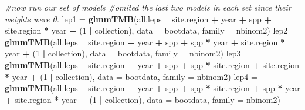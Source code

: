\documentclass[]{article}
\newenvironment{Shaded}{\begin{snugshade}}{\end{snugshade}}
\newcommand{\KeywordTok}[1]{\textcolor[rgb]{0.13,0.29,0.53}{\textbf{#1}}}
\newcommand{\DataTypeTok}[1]{\textcolor[rgb]{0.13,0.29,0.53}{#1}}
\newcommand{\DecValTok}[1]{\textcolor[rgb]{0.00,0.00,0.81}{#1}}
\newcommand{\StringTok}[1]{\textcolor[rgb]{0.31,0.60,0.02}{#1}}
\newcommand{\CommentTok}[1]{\textcolor[rgb]{0.56,0.35,0.01}{\textit{#1}}}
\newcommand{\OperatorTok}[1]{\textcolor[rgb]{0.81,0.36,0.00}{\textbf{#1}}}
\newcommand{\NormalTok}[1]{#1}
\begin{document}
\begin{Shaded}
\begin{Highlighting}[]
{{{{{{{{{{{{{{{{{{{{{{{{{{{{{{{{{{{{{{{{{{{{{{{{{{{{{{{{{{{{{{{{{{{{{{{{{  \CommentTok{#now run our set of models       }
  \CommentTok{#omited the last two models in each set since their weights were 0. }
\NormalTok{  lep1 =}\StringTok{ }\KeywordTok{glmmTMB}\NormalTok{(all.leps }\OperatorTok{~}\StringTok{ }\NormalTok{site.region }\OperatorTok{+}\StringTok{ }\NormalTok{year }\OperatorTok{+}\StringTok{ }\NormalTok{spp }\OperatorTok{+}\StringTok{ }
\StringTok{                   }\NormalTok{site.region }\OperatorTok{*}\StringTok{ }\NormalTok{year }\OperatorTok{+}\StringTok{ }
\StringTok{                   }\NormalTok{(}\DecValTok{1} \OperatorTok{|}\StringTok{ }\NormalTok{collection), }\DataTypeTok{data =}\NormalTok{ bootdata, }\DataTypeTok{family =}\NormalTok{ nbinom2) }
\NormalTok{  lep2 =}\StringTok{ }\KeywordTok{glmmTMB}\NormalTok{(all.leps }\OperatorTok{~}\StringTok{ }\NormalTok{site.region }\OperatorTok{+}\StringTok{ }\NormalTok{year }\OperatorTok{+}\StringTok{ }\NormalTok{spp }\OperatorTok{+}\StringTok{ }
\StringTok{                   }\NormalTok{spp }\OperatorTok{*}\StringTok{ }\NormalTok{year }\OperatorTok{+}\StringTok{ }\NormalTok{site.region }\OperatorTok{*}\StringTok{ }\NormalTok{year }\OperatorTok{+}\StringTok{ }
\StringTok{                   }\NormalTok{(}\DecValTok{1} \OperatorTok{|}\StringTok{ }\NormalTok{collection), }\DataTypeTok{data =}\NormalTok{ bootdata, }\DataTypeTok{family =}\NormalTok{ nbinom2) }
\NormalTok{  lep3 =}\StringTok{ }\KeywordTok{glmmTMB}\NormalTok{(all.leps }\OperatorTok{~}\StringTok{ }\NormalTok{site.region }\OperatorTok{+}\StringTok{ }\NormalTok{year }\OperatorTok{+}\StringTok{ }\NormalTok{spp }\OperatorTok{+}\StringTok{ }
\StringTok{                   }\NormalTok{spp }\OperatorTok{*}\StringTok{ }\NormalTok{site.region }\OperatorTok{+}\StringTok{ }\NormalTok{site.region }\OperatorTok{*}\StringTok{ }\NormalTok{year }\OperatorTok{+}\StringTok{ }
\StringTok{                   }\NormalTok{(}\DecValTok{1} \OperatorTok{|}\StringTok{ }\NormalTok{collection), }\DataTypeTok{data =}\NormalTok{ bootdata, }\DataTypeTok{family =}\NormalTok{ nbinom2) }
\NormalTok{  lep4 =}\StringTok{ }\KeywordTok{glmmTMB}\NormalTok{(all.leps }\OperatorTok{~}\StringTok{ }\NormalTok{site.region }\OperatorTok{+}\StringTok{ }\NormalTok{year }\OperatorTok{+}\StringTok{ }\NormalTok{spp }\OperatorTok{+}\StringTok{ }
\StringTok{                   }\NormalTok{spp }\OperatorTok{*}\StringTok{ }\NormalTok{site.region }\OperatorTok{+}\StringTok{ }\NormalTok{spp }\OperatorTok{*}\StringTok{ }\NormalTok{year }\OperatorTok{+}\StringTok{ }\NormalTok{site.region }\OperatorTok{*}\StringTok{ }\NormalTok{year }\OperatorTok{+}\StringTok{ }
\StringTok{                   }\NormalTok{(}\DecValTok{1} \OperatorTok{|}\StringTok{ }\NormalTok{collection), }\DataTypeTok{data =}\NormalTok{ bootdata, }\DataTypeTok{family =}\NormalTok{ nbinom2) }
}}}}}}}}}}}}}}}}}}}}}}}}}}}}}}}}}}}}}}}}}}}}}}}}}}}}}}}}}}}}}}}}}}}}}}}}}
\end{Highlighting}
\end{Shaded}
\end{document}

